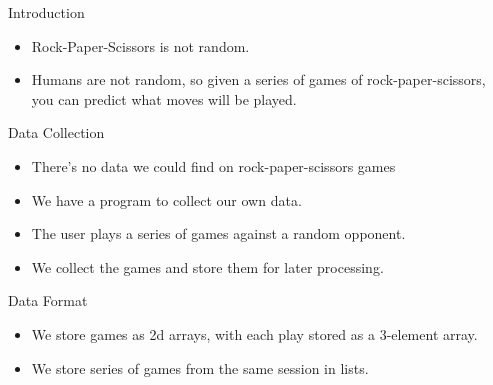 

\begin{frame}
    \titlepage
\end{frame}

\begin{frame}{Introduction}
    \begin{itemize}
        \item Rock-Paper-Scissors is not random.
        \item Humans are not random, so given a series of games of
        rock-paper-scissors, you can predict what moves will be played.
    \end{itemize}
\end{frame}

\begin{frame}{Data Collection}
    \begin{itemize}
        \item There's no data we could find on rock-paper-scissors games
        \item We have a program to collect our own data.

        \item The user plays a series of games against a random opponent.
        \item We collect the games and store them for later processing.
    \end{itemize}
\end{frame}

\begin{frame}{Data Format}
    \begin{itemize}
        \item We store games as 2d arrays, with each play stored as a 3-element array.
        \item We store series of games from the same session in lists.
    \end{itemize}
\end{frame}

